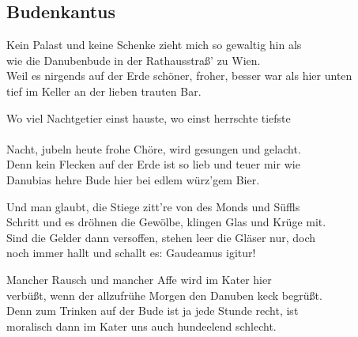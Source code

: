 
\subsection*{Budenkantus}
%


\thestrophe Kein Palast und keine Schenke zieht mich so gewaltig hin als \\
wie die Danubenbude in der Rathausstraß' zu Wien. \\
Weil es nirgends auf der Erde schöner, froher, besser war als hier unten \\
tief im Keller an der lieben trauten Bar.

\thestrophe Wo viel Nachtgetier einst hauste, wo einst herrschte tiefste \\\\
Nacht, jubeln heute frohe Chöre, wird gesungen und gelacht. \\
Denn kein Flecken auf der Erde ist so lieb und teuer mir wie \\
Danubias hehre Bude hier bei edlem würz'gem Bier.

\thestrophe Und man glaubt, die Stiege zitt're von des Monds und Süffls \\
Schritt und es dröhnen die Gewölbe, klingen Glas und Krüge mit. \\
Sind die Gelder dann versoffen, stehen leer die Gläser nur, doch \\
noch immer hallt und schallt es: Gaudeamus igitur!

\thestrophe Mancher Rausch und mancher Affe wird im Kater hier \\
verbüßt, wenn der allzufrühe Morgen den Danuben keck begrüßt. \\
Denn zum Trinken auf der Bude ist ja jede Stunde recht, ist \\
moralisch dann im Kater uns auch hundeelend schlecht.